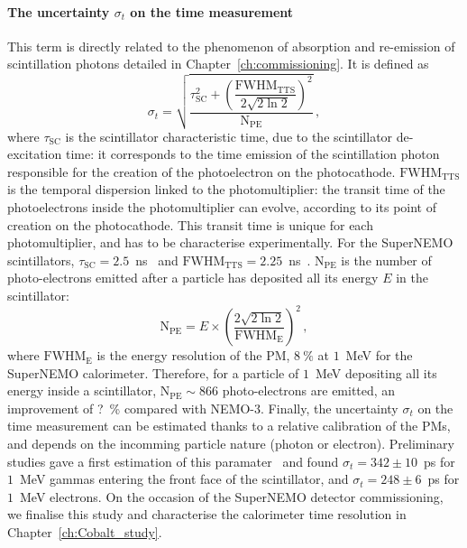 \paragraph{The uncertainty $\sigma_{t}$ on the time measurement}
This term is directly related to the phenomenon of absorption and re-emission of scintillation photons detailed in Chapter~\ref{ch:commissioning}.
It is defined as
\begin{equation}
  \sigma_{t}=\sqrt{\dfrac{\tau_{\text{SC}}^{2}+\left(\dfrac{\text{FWHM}_{\text{TTS}}}{2\sqrt{2\ln{2}}}\right)^{2}}{\text{N}_\text{PE}}}\,,
  \label{eq:sigma_t}
\end{equation}
where $\tau_{\text{SC}}$ is the scintillator characteristic time, due to the scintillator de-excitation time: it corresponds to the time emission of the scintillation photon responsible for the creation of the photoelectron on the photocathode.
$\text{FWHM}_{\text{TTS}}$ is the temporal dispersion linked to the photomultiplier: the transit time of the photoelectrons inside the photomultiplier can evolve, according to its point of creation on the photocathode.
This transit time is unique for each photomultiplier, and has to be characterise experimentally.
For the SuperNEMO scintillators, $\tau_{\text{SC}}=2.5$~ns~\cite{ref} and $\text{FWHM}_{\text{TTS}}=2.25$~ns~\cite{ref}.
$\text{N}_\text{PE}$ is the number of photo-electrons emitted after a particle has deposited all its energy $E$ in the scintillator:
\begin{equation}
  \text{N}_\text{PE} = E\times \left(\frac{2\sqrt{2\ln 2}}{\text{FWHM}_{\text{E}}}\right)^{2}\,,
\end{equation}
where $\text{FWHM}_{\text{E}}$ is the energy resolution of the PM, $8~\%$ at $1$~MeV for the SuperNEMO calorimeter.
Therefore, for a particle of $1$~MeV depositing all its energy inside a scintillator, $\text{N}_\text{PE}\sim 866$ photo-electrons are emitted, an improvement of ?~\% compared with NEMO-$3$.
Finally, the uncertainty $\sigma_{t}$ on the time measurement can be estimated thanks to a relative calibration of the PMs, and depends on the incomming particle nature (photon or electron).
Preliminary studies gave a first estimation of this paramater~\cite{HuberThesis} and found $\sigma_{t}=342\pm 10$~ps for $1$~MeV gammas entering the front face of the scintillator, and $\sigma_{t}=248\pm 6$~ps for $1$~MeV electrons.
On the occasion of the SuperNEMO detector commissioning, we finalise this study and characterise the calorimeter time resolution in Chapter~\ref{ch:Cobalt_study}.

